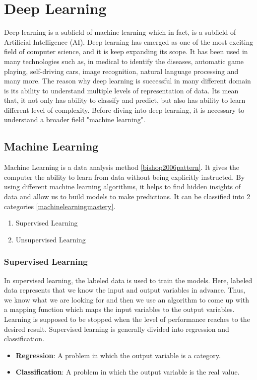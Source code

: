 \chapter{Deep Learning}

Deep learning is a subfield of machine learning which in fact, is a subfield of Artificial Intelligence (AI). Deep learning has emerged as one of the most exciting field of computer science, and it is keep expanding its scope. It has been used in many technologies such as, in medical to identify the diseases, automatic game playing, self-driving cars, image recognition, natural language processing and many more. The reason why deep learning is successful in many different domain is its ability to understand multiple levels of representation of data. Its mean that, it not only has ability to classify and predict, but also has ability to learn different level of complexity. Before diving into deep learning, it is necessary to understand a broader field "machine learning".

\section{Machine Learning}

Machine Learning is a data analysis method \ref{bishop2006pattern}. It gives the computer the ability to learn from data without being explicitly instructed. By using different machine learning algorithms, it helps to find hidden insights of data and allow us to build models to make predictions. It can be classified into 2 categories \ref{machinelearningmastery}.

\begin{enumerate}
	\item Supervised Learning
	\item Unsupervised Learning
\end{enumerate}

\subsection{Supervised Learning}

In supervised learning, the labeled data is used to train the models. Here, labeled data represents that we know the input and output variables in advance. Thus, we know what we are looking for and then we use an algorithm to come up with a mapping function which maps the input variables to the output variables. Learning is supposed to be stopped when the level of performance reaches to the desired result. Supervised learning is generally divided into regression and classification.
\begin{itemize}
	\item \textbf{Regression}: A problem in which the output variable is a category.
	\item \textbf{Classification}: A problem in which the output variable is the real value.
\end{itemize}

